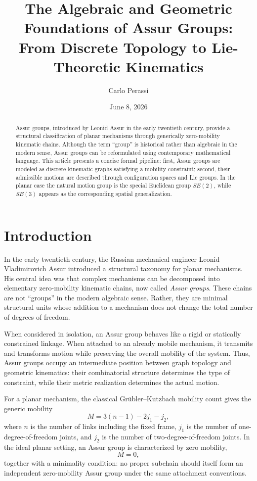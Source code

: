 \documentclass[12pt,a4paper]{article}
\title{The Algebraic and Geometric Foundations of Assur Groups:\\
From Discrete Topology to Lie-Theoretic Kinematics}
\author{Carlo Perassi}
\date{June 8, 2026}
\begin{document}
\maketitle

\begin{abstract}
Assur groups, introduced by Leonid Assur in the early twentieth century, provide a structural classification of planar mechanisms through generically zero-mobility kinematic chains. Although the term ``group'' is historical rather than algebraic in the modern sense, Assur groups can be reformulated using contemporary mathematical language. This article presents a concise formal pipeline: first, Assur groups are modeled as discrete kinematic graphs satisfying a mobility constraint; second, their admissible motions are described through configuration spaces and Lie groups. In the planar case the natural motion group is the special Euclidean group $SE(2)$, while $SE(3)$ appears as the corresponding spatial generalization.
\end{abstract}

\section{Introduction}

In the early twentieth century, the Russian mechanical engineer Leonid Vladimirovich Assur introduced a structural taxonomy for planar mechanisms. His central idea was that complex mechanisms can be decomposed into elementary zero-mobility kinematic chains, now called \emph{Assur groups}. These chains are not ``groups'' in the modern algebraic sense. Rather, they are minimal structural units whose addition to a mechanism does not change the total number of degrees of freedom.

When considered in isolation, an Assur group behaves like a rigid or statically constrained linkage. When attached to an already mobile mechanism, it transmits and transforms motion while preserving the overall mobility of the system. Thus, Assur groups occupy an intermediate position between graph topology and geometric kinematics: their combinatorial structure determines the type of constraint, while their metric realization determines the actual motion.

For a planar mechanism, the classical Gr\"ubler--Kutzbach mobility count gives the generic mobility
\begin{equation}
M = 3(n - 1) - 2j_1 - j_2,
\end{equation}
where $n$ is the number of links including the fixed frame, $j_1$ is the number of one-degree-of-freedom joints, and $j_2$ is the number of two-degree-of-freedom joints. In the ideal planar setting, an Assur group is characterized by zero mobility,
\begin{equation}
M = 0,
\end{equation}
together with a minimality condition: no proper subchain should itself form an independent zero-mobility Assur group under the same attachment conventions.
\end{document}
